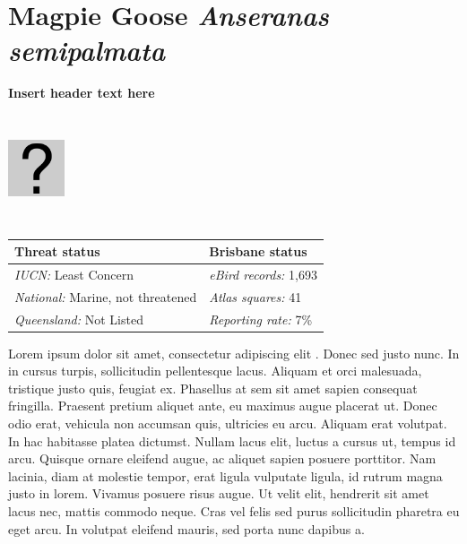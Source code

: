 \documentclass[12pt,openany,oneside]{book}
\let\origfigure\figure
\let\endorigfigure\endfigure
\renewenvironment{figure}[1][2] {
  \expandafter\origfigure\expandafter[H]
} {
  \endorigfigure
}
\theoremstyle{definition}
\theoremstyle{definition}
\theoremstyle{definition}
\theoremstyle{remark}
\begin{document}
\clearpage

\hypertarget{magpie-goose-anseranas-semipalmata}{%
\section{\texorpdfstring{Magpie Goose \emph{Anseranas
semipalmata}}{Magpie Goose Anseranas semipalmata}}\label{magpie-goose-anseranas-semipalmata}}


\textbf{Insert header text here}

\begin{figure}
\centering
\includegraphics[width=63px,height=120px]{assets/profile/missing.png}
\caption{Insert caption here.}
\end{figure}

\begin{tabu} to 
\toprule
Threat status & Brisbane status\\
\midrule
\textit{IUCN:} Least Concern & \textit{eBird records:} 1,693\\
\textit{National:} Marine, not threatened & \textit{Atlas squares:} 41\\
\textit{Queensland:} Not Listed & \textit{Reporting rate:} 7\%\\
\bottomrule
\end{tabu}

Lorem ipsum dolor sit amet, consectetur adipiscing elit
\citep{rexample1, rexample2, rexample3}. Donec sed justo nunc. In in
cursus turpis, sollicitudin pellentesque lacus. Aliquam et orci
malesuada, tristique justo quis, feugiat ex. Phasellus at sem sit amet
sapien consequat fringilla. Praesent pretium aliquet ante, eu maximus
augue placerat ut. Donec odio erat, vehicula non accumsan quis,
ultricies eu arcu. Aliquam erat volutpat. In hac habitasse platea
dictumst. Nullam lacus elit, luctus a cursus ut, tempus id arcu. Quisque
ornare eleifend augue, ac aliquet sapien posuere porttitor. Nam lacinia,
diam at molestie tempor, erat ligula vulputate ligula, id rutrum magna
justo in lorem. Vivamus posuere risus augue. Ut velit elit, hendrerit
sit amet lacus nec, mattis commodo neque. Cras vel felis sed purus
sollicitudin pharetra eu eget arcu. In volutpat eleifend mauris, sed
porta nunc dapibus a.
\end{document}
